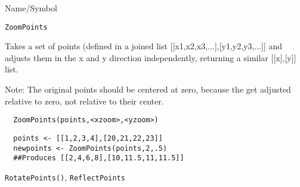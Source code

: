 \begin{desc}{Name/Symbol}
\item[Name/Symbol]	\verb+ZoomPoints+

\item[Description]  Takes a set of points (defined in a joined list 
[[x1,x2,x3,...],[y1,y2,y3,...]] and adjusts them in the x and y
direction independently, returning a similar [[x],[y]] list.

Note: The original points should be centered at zero, because the get
adjusted relative to zero, not relative to their center.

\item[Usage]
\begin{verbatim}
  ZoomPoints(points,<xzoom>,<yzoom>)
\end{verbatim}

\item[Example] 
\begin{verbatim}
  points <- [[1,2,3,4],[20,21,22,23]]
  newpoints <- ZoomPoints(points,2,.5)
  ##Produces [[2,4,6,8],[10,11.5,11,11.5]]
\end{verbatim}

\item[See Also] \verb+RotatePoints()+, \verb+ReflectPoints+
\end{desc}

\rl

